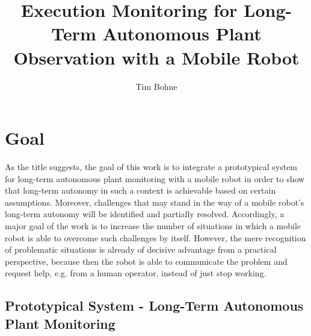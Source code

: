 \documentclass[english, master, expose, utf8]{base/thesis_KBS}
\begin{document}
\title{Execution Monitoring for Long-Term Autonomous Plant Observation with a Mobile Robot}
\author{Tim Bohne}

\generatetitle

\section{Goal}

As the title suggests, the goal of this work is to integrate a prototypical system for long-term autonomous plant monitoring with a mobile robot
in order to show that long-term autonomy in such a context is achievable based on certain assumptions.
Moreover, challenges that may stand in the way of a mobile robot's long-term autonomy will be identified and partially resolved.
Accordingly, a major goal of the work is to increase the number of situations in which a mobile robot is able to overcome such challenges by itself.
However, the mere recognition of problematic situations is already of decisive advantage from a practical perspective, because then the robot is able 
to communicate the problem and request help, e.g. from a human operator, instead of just stop working.

\subsection{Prototypical System - Long-Term Autonomous Plant Monitoring}
\label{sec:prototypical_system}
\end{document}
